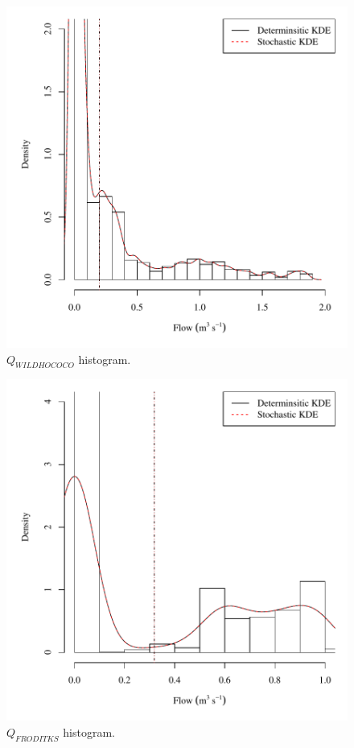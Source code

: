\begin{center}
\begin{figure}[htbp]
	\includegraphics[width=6in]{"Figures/Results_DSR/V density qWIL"}
	\caption{$Q_{WILDHOCOCO}$ histogram.}
\end{figure}
\end{center}
\newpage

\begin{center}
\begin{figure}[htbp]
	\includegraphics[width=6in]{"Figures/Results_DSR/V density qFRO"}
	\caption{$Q_{FRODITKS}$ histogram.}
\end{figure}
\end{center}
\newpage

